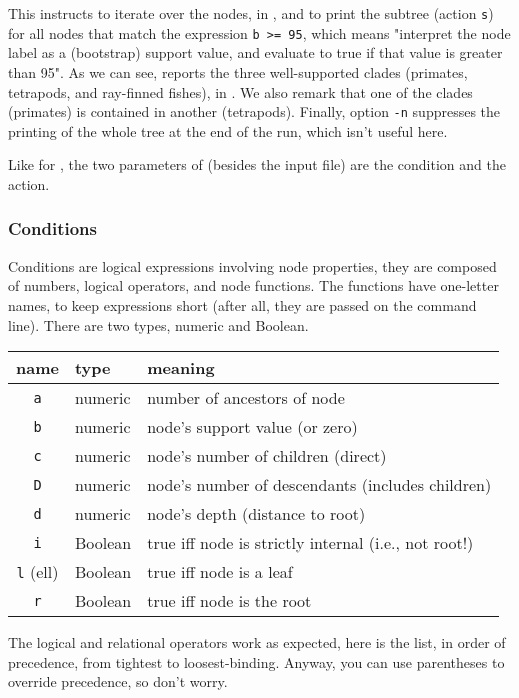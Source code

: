 \noindent{}This instructs \ed{} to iterate over the nodes, in \no{}, and to
print the subtree (action \texttt{s}) for all nodes that match the expression
\texttt{b >= 95}, which means "interpret the node label as a (bootstrap) support
value, and evaluate to true if that value is greater than 95". As we can see,
\ed{} reports the three well-supported clades (primates, tetrapods, and
ray-finned fishes), in \no. We also remark that one of the clades (primates) is
contained in another (tetrapods). Finally, option \texttt{-n} suppresses
the printing of the whole tree at the end of the run, which isn't useful here.

Like for \luaed, the two parameters of \ed{} (besides the input file) are the
condition and the action. 

\subsubsection{Conditions}

Conditions are logical expressions involving node properties, they are composed
of numbers, logical operators, and node functions.  The functions have
one-letter names, to keep expressions short (after all, they are passed on the
command line). There are two types, numeric and Boolean.

\begin{center}
\begin{tabular}{cll}
name & type & meaning \\
\hline
\texttt{a} & numeric & number of ancestors of node	 \\
\texttt{b} & numeric & node's support value (or zero) \\
\texttt{c} & numeric & node's number of children (direct) \\
\texttt{D} & numeric & node's number of descendants (includes children) \\
\texttt{d} & numeric & node's depth (distance to root) \\
\texttt{i} & Boolean & true iff node is strictly internal (i.e., not root!) \\
\texttt{l} (ell) & Boolean & true iff node is a leaf \\
\texttt{r} & Boolean & true iff node is the root
\end{tabular}
\end{center}

The logical and relational operators work as expected, here is the list, in
order of precedence, from tightest to loosest-binding.  Anyway, you can use
parentheses to override precedence, so don't worry.

